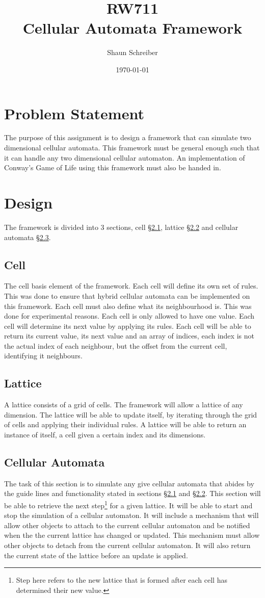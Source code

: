 \documentclass[a4paper, 10pt]{article}
\title{RW711\\Cellular Automata Framework}
\author{Shaun Schreiber}
\date{\today}
\begin{document}
\maketitle
\tableofcontents
\section{Problem Statement}
\label{ps}
The purpose of this assignment is to design a framework that can simulate two dimensional cellular automata. This framework must be general enough such that it can handle any two dimensional cellular automaton. An implementation of Conway's Game of Life using this framework must also be handed in.
\section{Design}
\label{design}
The framework is divided into 3 sections, cell \S\ref{dcell}, lattice \S\ref{dlattice} and
cellular automata \S\ref{dca}.
\subsection{Cell}
\label{dcell}
The cell basis element of the framework. Each cell will define its own set of rules. This was done to ensure that hybrid cellular automata can be implemented on this framework.
Each cell must also define what its neighbourhood is. This was done for experimental reasons. Each cell is only allowed to have one value. Each cell will determine its next value by applying its rules. Each cell will be able to return its current value, its next value and an array of indices, each index is not the actual index of each neighbour, but the offset from the current cell, identifying it neighbours.
\subsection{Lattice}
\label{dlattice}
A lattice consists of a grid of cells. The framework will allow a lattice of any dimension. The lattice will be able to update itself, by iterating through the grid of cells and applying their individual rules. A lattice will be able to return an instance of itself, a cell given a certain index and its dimensions.
\subsection{Cellular Automata}
\label{dca}
The task of this section is to simulate any give cellular automata that abides by the guide lines and functionality stated in sections \S\ref{dcell} and \S\ref{dlattice}.
This section will be able to retrieve the next step\footnote{Step here refers to the new lattice that is formed after each cell has determined their new value.} for a given lattice. It will be able to start and stop the simulation of a cellular automaton.
It will include a mechanism that will allow other objects to attach to the current cellular automaton and be notified when the the current lattice has changed or updated. This mechanism must allow other objects to detach from the current cellular automaton. It will also return the current state of the lattice before an update is applied.
\end{document}
